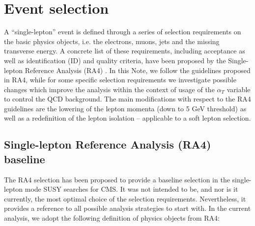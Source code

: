 \section{Event selection}
\label{sec:evtsel}

A ``single-lepton'' event is defined through a series of selection requirements on the basic physics objects, i.e. the electrons, muons, jets and the missing transverse energy. A concrete list of these requirements, including acceptance as well as identification (ID) and quality criteria, have been proposed by the Single-lepton Reference Analysis (RA4) \cite{ra4}. In this Note, we follow the guidelines proposed in RA4, while for some specific selection requirements we investigate possible changes which improve the analysis within the context of usage of the $\alpha_{T}$ variable to control the QCD background. The main modifications with respect to the RA4 guidelines are the lowering of the lepton momenta (down to 5 GeV threshold) as well as a redefinition of the lepton isolation -- applicable to a soft lepton selection.

\subsection{Single-lepton Reference Analysis (RA4) baseline}

The RA4 selection \cite{ra4} has been proposed to provide a baseline selection in the single-lepton mode SUSY searches for CMS. It was not intended to be, and nor is it currently, the most optimal choice of the selection requirements.  Nevertheless, it provides a reference to all possible analysis strategies to start with. In the current analysis, we adopt the following definition of physics objects from RA4:

